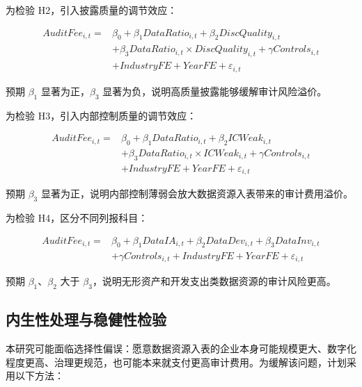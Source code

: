\documentclass[UTF8,zihao=-4,a4paper]{ctexart}
\begin{document}
为检验 H2，引入披露质量的调节效应：

\begin{equation}
\begin{aligned}
AuditFee_{i,t} ={}& \beta_0 + \beta_1 DataRatio_{i,t}
+ \beta_2 DiscQuality_{i,t} \\
&+ \beta_3 DataRatio_{i,t} \times DiscQuality_{i,t}
+ \gamma Controls_{i,t} \\
&+ IndustryFE + YearFE + \varepsilon_{i,t}
\end{aligned}
\end{equation}

预期 $\beta_1$ 显著为正，$\beta_3$ 显著为负，说明高质量披露能够缓解审计风险溢价。

为检验 H3，引入内部控制质量的调节效应：

\begin{equation}
\begin{aligned}
AuditFee_{i,t} ={}& \beta_0 + \beta_1 DataRatio_{i,t}
+ \beta_2 ICWeak_{i,t} \\
&+ \beta_3 DataRatio_{i,t} \times ICWeak_{i,t}
+ \gamma Controls_{i,t} \\
&+ IndustryFE + YearFE + \varepsilon_{i,t}
\end{aligned}
\end{equation}

预期 $\beta_3$ 显著为正，说明内部控制薄弱会放大数据资源入表带来的审计费用溢价。

为检验 H4，区分不同列报科目：

\begin{equation}
\begin{aligned}
AuditFee_{i,t} ={}& \beta_0 + \beta_1 DataIA_{i,t}
+ \beta_2 DataDev_{i,t}
+ \beta_3 DataInv_{i,t} \\
&+ \gamma Controls_{i,t} + IndustryFE + YearFE + \varepsilon_{i,t}
\end{aligned}
\end{equation}

预期 $\beta_1$、$\beta_2$ 大于 $\beta_3$，说明无形资产和开发支出类数据资源的审计风险更高。

\subsection{内生性处理与稳健性检验}

本研究可能面临选择性偏误：愿意数据资源入表的企业本身可能规模更大、数字化程度更高、治理更规范，也可能本来就支付更高审计费用。为缓解该问题，计划采用以下方法：
\end{document}
